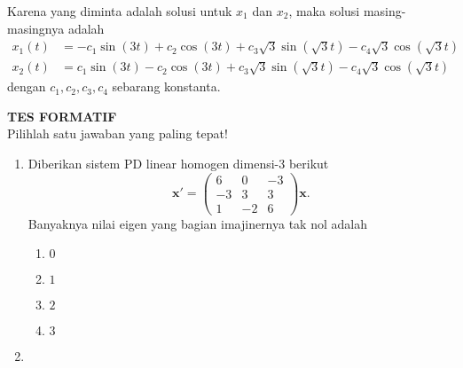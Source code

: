 \documentclass[a4paper]{article}
\theoremstyle{definisi}
\numberwithin{equation}{section}
\begin{document}
\begin{enumerate}
    Karena yang diminta adalah solusi untuk $x_1$ dan $x_2$, maka solusi masing-masingnya adalah
    \begin{align*}
      x_1(t) &= -c_1\sin(3t) + c_2\cos(3t) + c_3\sqrt{3}\sin(\sqrt{3}t) - c_4\sqrt{3}\cos(\sqrt{3}t)\\
      x_2(t) &= c_1\sin(3t) - c_2\cos(3t) + c_3\sqrt{3}\sin(\sqrt{3}t)- c_4\sqrt{3}\cos(\sqrt{3}t)
    \end{align*}
    dengan $c_1, c_2, c_3, c_4$ sebarang konstanta.
  \end{enumerate}
  \newpage
  \noindent\textbf{TES FORMATIF}\\
  Pilihlah satu jawaban yang paling tepat!
  \begin{enumerate}
    \item Diberikan sistem PD linear homogen dimensi-$3$ berikut
    \[\mathbf{x'} = \begin{pmatrix}
      6 & 0 & -3\\
      -3 & 3 & 3\\
      1 & -2 & 6
    \end{pmatrix}\mathbf{x}.\]
    Banyaknya nilai eigen yang bagian imajinernya tak nol adalah
    \begin{enumerate}
      \item $0$
      \item $1$
      \item $2$
      \item $3$
    \end{enumerate}

    \item 
  \end{enumerate}
\end{document}
